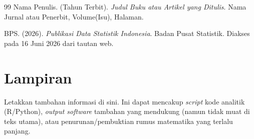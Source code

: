 \documentclass[12pt, a4paper]{article}
\begin{document}
\begin{thebibliography}{99}
Nama Penulis. (Tahun Terbit). \textit{Judul Buku atau Artikel yang Ditulis}. Nama Jurnal atau Penerbit, Volume(Isu), Halaman.

BPS. (2026). \textit{Publikasi Data Statistik Indonesia}. Badan Pusat Statistik. Diakses pada 16 Juni 2026 dari tautan web.
\end{thebibliography}

\newpage
\appendix
\section{Lampiran}
Letakkan tambahan informasi di sini. Ini dapat mencakup \textit{script} kode analitik (R/Python), \textit{output software} tambahan yang mendukung (namun tidak muat di teks utama), atau penurunan/pembuktian rumus matematika yang terlalu panjang.
\end{document}

